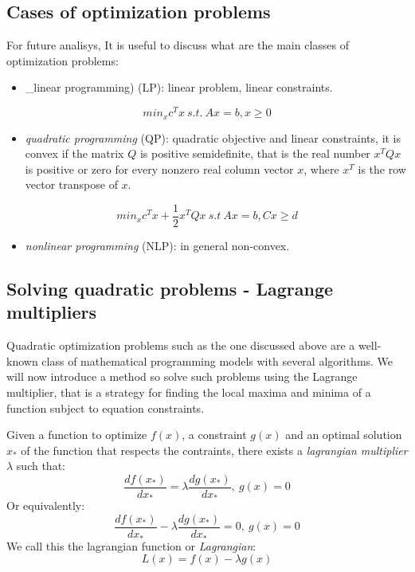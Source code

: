 \documentclass{article}
\begin{document}
\subsection{Cases of optimization
problems}\label{cases-of-optimization-problems}

For future analisys, It is useful to discuss what are the main classes
of optimization problems:

\begin{itemize}
\tightlist
\item
  \_linear programming) (LP): linear problem, linear constraints.
\end{itemize}

\[min_{x} c^Tx\ s.t.\ Ax = b, x \ge 0\]

\begin{itemize}
\tightlist
\item
  \emph{quadratic programming} (QP): quadratic objective and linear
  constraints, it is convex if the matrix \(Q\) is positive
  semidefinite, that is the real number \(x^TQx\) is positive or zero
  for every nonzero real column vector \(x\), where \(x^T\) is the row
  vector transpose of \(x\).
\end{itemize}

\[min_{x} c^Tx + \frac{1}{2}x^TQx\ s.t\ Ax = b, Cx \ge d\]

\begin{itemize}
\tightlist
\item
  \emph{nonlinear programming} (NLP): in general non-convex.
\end{itemize}

\subsection{Solving quadratic problems - Lagrange
multipliers}\label{solving-quadratic-problems---lagrange-multipliers}

Quadratic optimization problems such as the one discussed above are a
well-known class of mathematical programming models with several
algorithms. We will now introduce a method so solve such problems using
the Lagrange multiplier, that is a strategy for finding the local maxima
and minima of a function subject to equation constraints.

Given a function to optimize \(f(x)\), a constraint \(g(x)\) and an
optimal solution \(x_*\) of the function that respects the contraints,
there exists a \emph{lagrangian multiplier} \(\lambda\) such that:
\[\frac{df(x_*)}{dx_*} = \lambda \frac{dg(x_*)}{dx_*},\ g(x) = 0\] Or
equivalently:
\[\frac{df(x_*)}{dx_*} - \lambda \frac{dg(x_*)}{dx_*} = 0,\ g(x) = 0\]
We call this the lagrangian function or \emph{Lagrangian}:
\[L(x) = f(x) - \lambda g(x)\]
\end{document}
